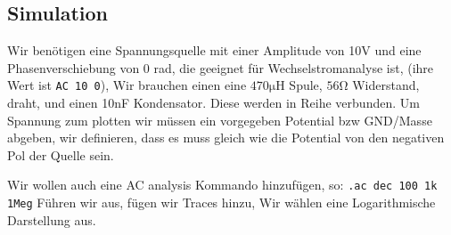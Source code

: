 \subsection{Simulation}
\label{subsec:3_Simulation}

%
Wir benötigen eine Spannungsquelle mit einer Amplitude von 10V und eine Phasenverschiebung von 0 rad, die geeignet für Wechselstromanalyse ist, (ihre Wert ist \lstinline{AC 10 0}),  Wir brauchen einen eine $470\si{\micro\henry}$ Spule, $56\si{\ohm}$ Widerstand, draht, und einen 10nF Kondensator. Diese werden in Reihe verbunden. Um Spannung zum plotten wir müssen ein vorgegeben Potential bzw GND/Masse abgeben, wir definieren, dass es muss gleich wie die Potential von den negativen Pol der Quelle sein.

Wir wollen auch eine AC analysis Kommando hinzufügen, so:  \lstinline{.ac dec 100 1k 1Meg}
Führen wir aus, fügen wir Traces hinzu, Wir wählen eine Logarithmische Darstellung aus.
%
%
%
%
%
%
%
